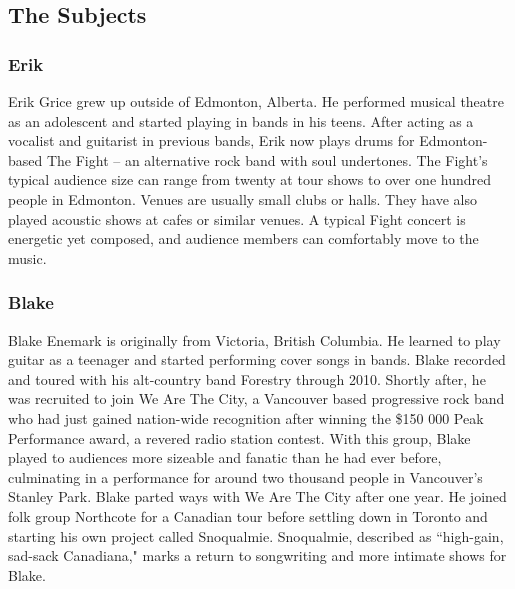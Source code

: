 \subsection{The Subjects}

\subsubsection{Erik}
Erik Grice grew up outside of Edmonton, Alberta. He performed musical theatre as an adolescent and started playing in bands in his teens. After acting as a vocalist and guitarist in previous bands, Erik now plays drums for Edmonton-based The Fight -- an alternative rock band with soul undertones. The Fight's typical audience size can range from twenty at tour shows to over one hundred people in Edmonton. Venues are usually small clubs or halls. They have also played acoustic shows at cafes or similar venues. A typical Fight concert is energetic yet composed, and audience members can comfortably move to the music.

\subsubsection{Blake}
Blake Enemark is originally from Victoria, British Columbia. He learned to play guitar as a teenager and started performing cover songs in bands. Blake recorded and toured with his alt-country band Forestry through 2010. Shortly after, he was recruited to join We Are The City, a Vancouver based progressive rock band who had just gained nation-wide recognition after winning the \$150 000 Peak Performance award, a revered radio station contest. With this group, Blake played to audiences more sizeable and fanatic than he had ever before, culminating in a performance for around two thousand people in Vancouver's Stanley Park. Blake parted ways with We Are The City after one year. He joined folk group Northcote for a Canadian tour before settling down in Toronto and starting his own project called Snoqualmie. Snoqualmie, described as ``high-gain, sad-sack Canadiana," marks a return to songwriting and more intimate shows for Blake.

